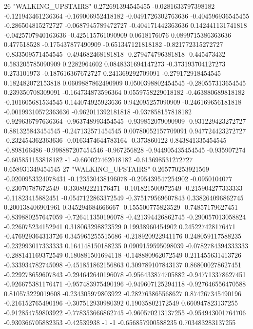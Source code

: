 26 "WALKING_UPSTAIRS" 0.272691394545455 -0.0281633797398182 -0.121943461236364 -0.169006952418182 -0.0491726302763636 -0.404596936545455 -0.286504815272727 -0.0687945789472727 -0.404171442363636 0.142441131741818 -0.0425707940163636 -0.425115761090909 0.0618176076 0.0899715386363636 0.477518528 -0.175437877490909 -0.651347121818182 -0.821772315272727 -0.833509571454545 -0.494682468181818 -0.279474796381818 -0.445473432 0.583205785090909 0.2282964602 0.0848331694147273 -0.373193704127273 0.273101973 -0.187616367672727 0.241369292709091 -0.279172918454545 0.182482072153818 0.0609887862490909 0.0500398802454545 -0.280557313654545 0.239350708309091 -0.164734873596364 0.0559758229018182 -0.463880689818182 -0.101605681534545 0.144074925923636 0.942095257090909 -0.246169656181818 -0.00199310572363636 -0.962011392181818 -0.937858157818182 -0.929636797636364 -0.963748993454545 -0.939852079090909 -0.931229423272727 0.881325843454545 -0.247132571454545 0.00780052157709091 0.947724423272727 -0.232454362363636 -0.0163474644783164 -0.373860122 0.843841335454545 -0.898166486 -0.998887207454546 -0.967256828 -0.944905435454545 -0.935907274 -0.605851153818182 -1 -0.660027462018182 -0.613698531272727 0.658931349454545
27 "WALKING_UPSTAIRS" 0.265770253921569 -0.0200953324078431 -0.123530438196078 -0.295439547254902 -0.0950104077 -0.23070787672549 -0.330892221176471 -0.101821500972549 -0.215904277333333 -0.11823415882451 -0.0547122863372549 -0.375179569607843 0.338264096862745 0.200138406901961 0.345294684666667 -0.155500775823529 -0.74857179627451 -0.839880257647059 -0.726411350196078 -0.421394426862745 -0.290057013058824 -0.226075234152941 0.318063298823529 0.19938960454902 0.245227428176471 -0.476929364313726 0.345965255515686 -0.218920922941176 0.248059117588235 -0.232993017333333 0.164148150188235 0.0909159595098039 -0.0782784394333333 -0.288141169372549 0.180881501694118 -0.148880962072549 0.211455631413726 -0.333934782745098 -0.451851862156863 0.309789107843137 0.868000278627451 -0.229278659607843 -0.294642640196078 -0.956433874705882 -0.947713378627451 -0.926675381176471 -0.957483975490196 -0.949607125294118 -0.927646556470588 0.810573229019608 -0.234305979803922 -0.282763865568627 0.874267345490196 -0.216152765490196 -0.307512930980392 0.19035802172549 0.660947823137255 -0.912854759803922 -0.778353666862745 -0.960570213137255 -0.954943001764706 -0.930366705882353 -0.42539938 -1 -1 -0.656857900588235 0.703483283137255
